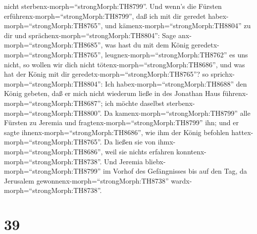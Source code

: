 nicht sterbenx-morph=``strongMorph:TH8799''.  Und wenn's
die Fürsten erführenx-morph=``strongMorph:TH8799'', daß ich mit dir
geredet habex-morph=``strongMorph:TH8765'', und
kämenx-morph=``strongMorph:TH8804'' zu dir und
sprächenx-morph=``strongMorph:TH8804'': Sage
anx-morph=``strongMorph:TH8685'', was hast du mit dem König
geredetx-morph=``strongMorph:TH8765'',
leugnex-morph=``strongMorph:TH8762'' es uns nicht, so wollen wir dich
nicht tötenx-morph=``strongMorph:TH8686'', und was hat der König mit dir
geredetx-morph=``strongMorph:TH8765''?  so
sprichx-morph=``strongMorph:TH8804'': Ich
habex-morph=``strongMorph:TH8688'' den König gebeten, daß er mich nicht
wiederum ließe in des Jonathan Haus
führenx-morph=``strongMorph:TH8687''; ich möchte daselbst
sterbenx-morph=``strongMorph:TH8800''.  Da
kamenx-morph=``strongMorph:TH8799'' alle Fürsten zu Jeremia und
fragtenx-morph=``strongMorph:TH8799'' ihn; und er sagte
ihnenx-morph=``strongMorph:TH8686'', wie ihm der König befohlen
hattex-morph=``strongMorph:TH8765''. Da ließen sie von
ihmx-morph=``strongMorph:TH8686'', weil sie nichts erfahren
konntenx-morph=``strongMorph:TH8738''.  Und Jeremia
bliebx-morph=``strongMorph:TH8799'' im Vorhof des Gefängnisses bis auf
den Tag, da Jerusalem gewonnenx-morph=``strongMorph:TH8738''
wardx-morph=``strongMorph:TH8738''.

\hypertarget{section-38}{%
\section{39}\label{section-38}}

